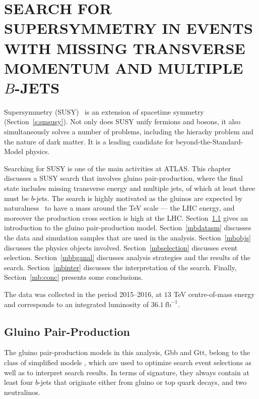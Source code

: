 \chapter{SEARCH FOR SUPERSYMMETRY IN EVENTS WITH MISSING TRANSVERSE MOMENTUM AND
  MULTIPLE $B$-JETS}\label{c:susys}

Supersymmetry
(SUSY)~\cite{Golfand:1971iw,Volkov:1973ix,Wess:1974tw,Wess:1974jb,Ferrara:1974pu,Salam:1974ig}
is an extension of spacetime symmetry (Section~\ref{s:smsusy}). Not only does
SUSY unify fermions and bosons, it also simultaneously solves a number of
problems, including the hierachy problem and the nature of dark matter. It is a
leading candidate for beyond-the-Standard-Model physics.

Searching for SUSY is one of the main activities at ATLAS. This chapter
discusses a SUSY search that involves gluino pair-production, where the final
state includes missing transverse energy and multiple jets, of which at least
three must be $b$-jets. The search is highly motivated as the gluinos are
expected by naturalness~\cite{Barbieri:1987fn} to have a mass around the TeV
scale --- the LHC energy, and moreover the production cross section is high at
the LHC. Section~\ref{mbmodel} gives an introduction to the gluino
pair-production model. Section~\ref{mbdatasm} discusses the data and simulation
samples that are used in the analysis. Section~\ref{mbobjs} discusses the
physics objects involved. Section~\ref{mbselection} discusses event selection.
Section~\ref{mbbganal} discusses analysis strategies and the results of the
search. Section~\ref{mbinter} discusses the interpretation of the search.
Finally, Section~\ref{mb:conc} presents some conclusions.


The data was collected in the period 2015--2016, at $13$ TeV centre-of-mass
energy and corresponds to an integrated luminosity of $36.1~\text{fb}^{-1}$.


\section{Gluino Pair-Production}\label{mbmodel}

The gluino pair-production models in this analysis, Gbb and Gtt, belong to the
class of simplified models \cite{Alwall:2008ag,Alves:2011wf}, which are used to
optimize search event selections as well as to interpret search results. In
terms of signature, they always contain at least four $b$-jets that originate
either from gluino or top quark decays, and two neutralinos.

